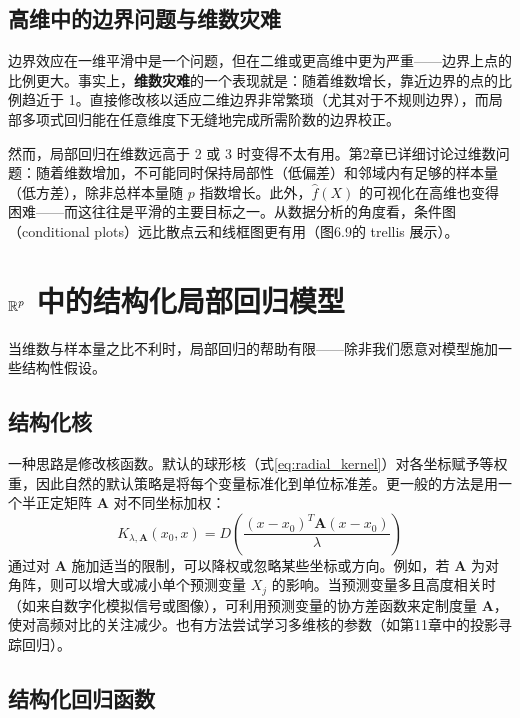\subsection{高维中的边界问题与维数灾难}

边界效应在一维平滑中是一个问题，但在二维或更高维中更为严重——边界上点的比例更大。事实上，\textbf{维数灾难}的一个表现就是：随着维数增长，靠近边界的点的比例趋近于 1。直接修改核以适应二维边界非常繁琐（尤其对于不规则边界），而局部多项式回归能在任意维度下无缝地完成所需阶数的边界校正。

然而，局部回归在维数远高于 2 或 3 时变得不太有用。第2章已详细讨论过维数问题：随着维数增加，不可能同时保持局部性（低偏差）和邻域内有足够的样本量（低方差），除非总样本量随 $p$ 指数增长。此外，$\hat{f}(X)$ 的可视化在高维也变得困难——而这往往是平滑的主要目标之一。从数据分析的角度看，条件图（conditional plots）远比散点云和线框图更有用（图6.9的 trellis 展示）。

\section{$\mathbb{R}^p$ 中的结构化局部回归模型}

当维数与样本量之比不利时，局部回归的帮助有限——除非我们愿意对模型施加一些结构性假设。

\subsection{结构化核}

一种思路是修改核函数。默认的球形核（式\ref{eq:radial_kernel}）对各坐标赋予等权重，因此自然的默认策略是将每个变量标准化到单位标准差。更一般的方法是用一个半正定矩阵 $\mathbf{A}$ 对不同坐标加权：
\begin{equation}\label{eq:structured_kernel}
    K_{\lambda, \mathbf{A}}(x_0, x) = D\!\left(\frac{(x - x_0)^T \mathbf{A} (x - x_0)}{\lambda}\right)
\end{equation}
通过对 $\mathbf{A}$ 施加适当的限制，可以降权或忽略某些坐标或方向。例如，若 $\mathbf{A}$ 为对角阵，则可以增大或减小单个预测变量 $X_j$ 的影响。当预测变量多且高度相关时（如来自数字化模拟信号或图像），可利用预测变量的协方差函数来定制度量 $\mathbf{A}$，使对高频对比的关注减少。也有方法尝试学习多维核的参数（如第11章中的投影寻踪回归）。

\subsection{结构化回归函数}

